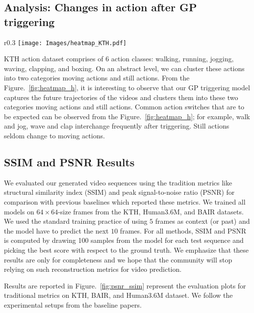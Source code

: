 \documentclass{article} \usepackage{iclr2021_conference,times}
\begin{document}
\subsection{Analysis: Changes in action after GP triggering}
\begin{wrapfigure}{r}{0.3\textwidth}
\vspace{-0.7in}
    \centering
     \texttt{[image: Images/heatmap\_KTH.pdf]}
    \caption{\textbf{Changes in action from past frames to future frames} on KTH dataset. Total of 25,000 generated videos were used to calculate percentage change shown in the above figure.}
    \label{fig:heatmap_h}
\end{wrapfigure}
KTH action dataset comprises of 6 action classes: walking, running, jogging, waving, clapping, and boxing. On an abstract level, we can cluster these actions into two categories moving actions and still actions. From the Figure.~\ref{fig:heatmap_h}, it is interesting to observe that our GP triggering model captures the future trajectories of the videos and clusters them into these two categories moving actions and still actions. Common action switches that are to be expected can be observed from the Figure.~\ref{fig:heatmap_h}; for example, walk and jog, wave and clap interchange frequently after triggering. Still actions seldom change to moving actions.

\clearpage

\subsection{SSIM and PSNR Results}
We evaluated our generated video sequences using the tradition metrics like structural similarity index (SSIM) and peak signal-to-noise ratio (PSNR) for comparison with previous baselines which reported these metrics. We trained all models on $64\times64$-size frames from the KTH, Human3.6M, and BAIR datasets. We used the standard training practice of using $5$ frames as context (or past) and the model have to predict the next $10$ frames. For all methods, SSIM and PSNR is computed by drawing 100 samples from the model for each test sequence and picking the best score with respect to the ground truth. We emphasize that these results are only for completeness and we hope that the community will stop relying on such reconstruction metrics for video prediction.

Results are reported in Figure.~\ref{fig:psnr_ssim} represent the evaluation plots for traditional metrics on KTH, BAIR, and Human3.6M dataset. We follow the experimental setups from the baseline papers.
\end{document}
